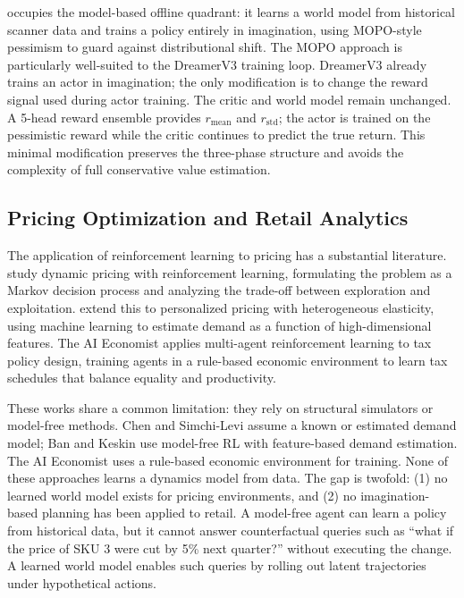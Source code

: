 \dreamprice{} occupies the model-based offline quadrant: it learns a world model from historical scanner data and trains a policy entirely in imagination, using MOPO-style pessimism to guard against distributional shift. The MOPO approach is particularly well-suited to the DreamerV3 training loop. DreamerV3 already trains an actor in imagination; the only modification is to change the reward signal used during actor training. The critic and world model remain unchanged. A 5-head reward ensemble provides $r_{\text{mean}}$ and $r_{\text{std}}$; the actor is trained on the pessimistic reward while the critic continues to predict the true return. This minimal modification preserves the three-phase structure and avoids the complexity of full conservative value estimation.

\subsection{Pricing Optimization and Retail Analytics}

The application of reinforcement learning to pricing has a substantial literature. \citet{chen2022dynamic} study dynamic pricing with reinforcement learning, formulating the problem as a Markov decision process and analyzing the trade-off between exploration and exploitation. \citet{ban2021personalized} extend this to personalized pricing with heterogeneous elasticity, using machine learning to estimate demand as a function of high-dimensional features. The AI Economist \citep{zheng2020aieconomist} applies multi-agent reinforcement learning to tax policy design, training agents in a rule-based economic environment to learn tax schedules that balance equality and productivity.

These works share a common limitation: they rely on structural simulators or model-free methods. Chen and Simchi-Levi assume a known or estimated demand model; Ban and Keskin use model-free RL with feature-based demand estimation. The AI Economist uses a rule-based economic environment for training. None of these approaches learns a dynamics model from data. The gap is twofold: (1) no learned world model exists for pricing environments, and (2) no imagination-based planning has been applied to retail. A model-free agent can learn a policy from historical data, but it cannot answer counterfactual queries such as ``what if the price of SKU 3 were cut by 5\% next quarter?'' without executing the change. A learned world model enables such queries by rolling out latent trajectories under hypothetical actions.

